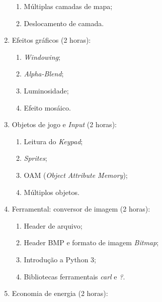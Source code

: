 \documentclass{article}
\begin{document}
\begin{enumerate}
\begin{samepage}
\begin{enumerate}
                \item Múltiplas camadas de mapa;
                \item Deslocamento de camada.
        \end{enumerate}
        \end{samepage}
    \item Efeitos gráficos (2 horas):
        \begin{samepage}
        \begin{enumerate}
                \item \textit{Windowing};
                \item \textit{Alpha-Blend};
                \item Luminosidade;
                \item Efeito mosáico.
        \end{enumerate}
        \end{samepage}
    \item Objetos de jogo e \textit{Input} (2 horas):
        \begin{samepage}
        \begin{enumerate}
                \item Leitura do \textit{Keypad};
                \item \textit{Sprites};
                \item OAM (\textit{Object Attribute Memory});
                \item Múltiplos objetos.
        \end{enumerate}
        \end{samepage}
    \item Ferramental: conversor de imagem (2 horas):
        \begin{samepage}
        \begin{enumerate}
                \item Header de arquivo;
                \item Header BMP e formato de imagem \textit{Bitmap};
                \item Introdução a Python 3;
                \item Bibliotecas ferramentais \textit{carl} e \textit{?}.
        \end{enumerate}
        \end{samepage}
    \item Economia de energia (2 horas):
        \begin{samepage}
        \begin{enumerate}

\end{enumerate}
\end{samepage}
\end{enumerate}
\end{document}
